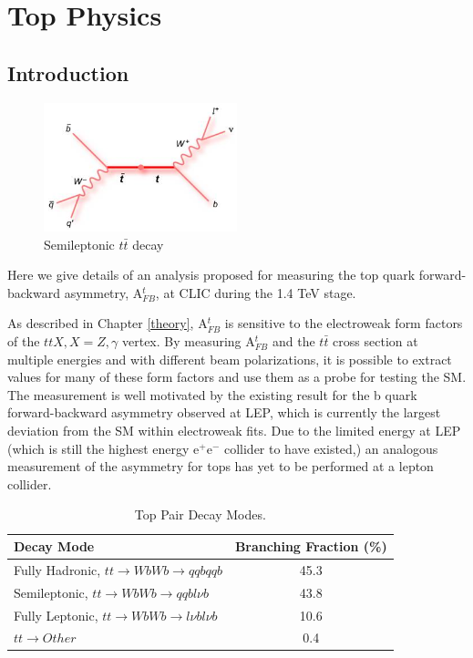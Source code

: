 \chapter{Top Physics}
\label{chapter:topanalysis}
\section{Introduction}

\begin{figure}
  \centering
  \includegraphics[width=0.5\textwidth]{TopAnalysis/figures/TopFeynmann.jpg}
  \caption[Semileptonic $t\bar{t}$ decay]{Semileptonic $t\bar{t}$ decay}
  \label{fig:topfeynmann}
\end{figure}

Here we give details of an analysis proposed for measuring the top quark forward-backward asymmetry, A$_{FB}^t$, at CLIC during the 1.4 TeV stage. 

As described in Chapter \ref{theory}, A$_{FB}^t$ is sensitive to the electroweak form factors of the $ttX, X=Z,\gamma$ vertex. By measuring A$_{FB}^t$ and the $t\bar{t}$ cross section at multiple energies and with different beam polarizations, it is possible to extract values for many of these form factors and use them as a probe for testing the \ac{SM}. The measurement is well motivated by the existing result for the b quark forward-backward asymmetry observed at \ac{LEP}\cite{ABBIENDI200229}, which is currently the largest deviation from the \ac{SM} within electroweak fits. Due to the limited energy at \ac{LEP} (which is still the highest energy e$^+$e$^-$ collider to have existed,) an analogous measurement of the asymmetry for tops has yet to be performed at a lepton collider. 

\begin{table}[b]
  \centering
  \begin{tabular}{l |c}
    \toprule
    Decay Mode     & Branching Fraction (\%) \\
    \midrule
    Fully Hadronic, $tt\rightarrow WbWb\rightarrow qqbqqb$ & 45.3  \\
    \midrule
    Semileptonic, $tt\rightarrow WbWb\rightarrow qqbl\nu b$ & 43.8 \\
    \midrule
    Fully Leptonic, $tt\rightarrow WbWb\rightarrow l\nu bl\nu b$ & 10.6 \\
    \midrule
    $tt\rightarrow Other$ & 0.4 \\
    \bottomrule
  \end{tabular}
  \caption[Top Pair Decay Modes]{Top Pair Decay Modes\cite{Patrignani:2016xqp}.}
  \label{table:topdecaymodes}
\end{table}

